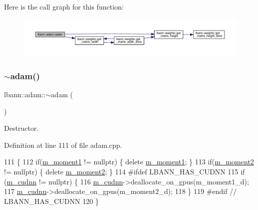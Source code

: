 Here is the call graph for this function\+:\nopagebreak
\begin{figure}[H]
\begin{center}
\leavevmode
\includegraphics[width=350pt]{classlbann_1_1adam_a77464b030ec2be620155eff22acdff76_cgraph}
\end{center}
\end{figure}
\mbox{\label{classlbann_1_1adam_a5ab2783191786e2c9c1c71d6edecfb2e}} 
\subsubsection{\texorpdfstring{$\sim$adam()}{~adam()}}
{\footnotesize\ttfamily lbann\+::adam\+::$\sim$adam (\begin{DoxyParamCaption}{ }\end{DoxyParamCaption})\hspace{0.3cm}{\ttfamily [override]}}

Destructor. 

Definition at line 111 of file adam.\+cpp.


\begin{DoxyCode}
111             \{
112   \textcolor{keywordflow}{if}(\hyperlink{classlbann_1_1adam_aa10a518a5356257bc69e655b88b0ed67}{m\_moment1} != \textcolor{keyword}{nullptr}) \{ \textcolor{keyword}{delete} \hyperlink{classlbann_1_1adam_aa10a518a5356257bc69e655b88b0ed67}{m\_moment1}; \}
113   \textcolor{keywordflow}{if}(\hyperlink{classlbann_1_1adam_aea3295a0ee7da5e9c56fd6ff2f05c63f}{m\_moment2} != \textcolor{keyword}{nullptr}) \{ \textcolor{keyword}{delete} \hyperlink{classlbann_1_1adam_aea3295a0ee7da5e9c56fd6ff2f05c63f}{m\_moment2}; \}
114 \textcolor{preprocessor}{  #ifdef LBANN\_HAS\_CUDNN}
115   \textcolor{keywordflow}{if} (\hyperlink{classlbann_1_1optimizer_a2f24dbeaca18b06f4aa7d179bbf96680}{m\_cudnn} != \textcolor{keyword}{nullptr}) \{
116     \hyperlink{classlbann_1_1optimizer_a2f24dbeaca18b06f4aa7d179bbf96680}{m\_cudnn}->deallocate\_on\_gpus(m\_moment1\_d);
117     \hyperlink{classlbann_1_1optimizer_a2f24dbeaca18b06f4aa7d179bbf96680}{m\_cudnn}->deallocate\_on\_gpus(m\_moment2\_d);
118   \}
119 \textcolor{preprocessor}{  #endif // LBANN\_HAS\_CUDNN}
120 \}
\end{DoxyCode}


